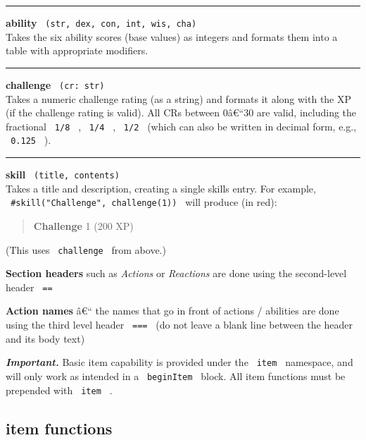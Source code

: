 \begin{center}\rule{0.5\linewidth}{0.5pt}\end{center}

\textbf{ability} \texttt{\ (str,\ dex,\ con,\ int,\ wis,\ cha)\ }\\
Takes the six ability scores (base values) as integers and formats them
into a table with appropriate modifiers.

\begin{center}\rule{0.5\linewidth}{0.5pt}\end{center}

\textbf{challenge} \texttt{\ (cr:\ str)\ }\\
Takes a numeric challenge rating (as a string) and formats it along with
the XP (if the challenge rating is valid). All CRs between 0â€``30 are
valid, including the fractional \texttt{\ 1/8\ } , \texttt{\ 1/4\ } ,
\texttt{\ 1/2\ } (which can also be written in decimal form, e.g.,
\texttt{\ 0.125\ } ).

\begin{center}\rule{0.5\linewidth}{0.5pt}\end{center}

\textbf{skill} \texttt{\ (title,\ contents)\ }\\
Takes a title and description, creating a single skills entry. For
example, \texttt{\ \#skill("Challenge",\ challenge(1))\ } will produce
(in red):

\begin{quote}
\textbf{Challenge} 1 (200 XP)
\end{quote}

(This uses \texttt{\ challenge\ } from above.)

\textbf{Section headers} such as \emph{Actions} or \emph{Reactions} are
done using the second-level header \texttt{\ ==\ }

\textbf{Action names} â€`` the names that go in front of actions /
abilities are done using the third level header \texttt{\ ===\ } (do not
leave a blank line between the header and its body text)

\emph{\textbf{Important.}} Basic item capability is provided under the
\texttt{\ item\ } namespace, and will only work as intended in a
\texttt{\ beginItem\ } block. All item functions must be prepended with
\texttt{\ item\ } .

\subsection{item functions}\label{item-functions}

